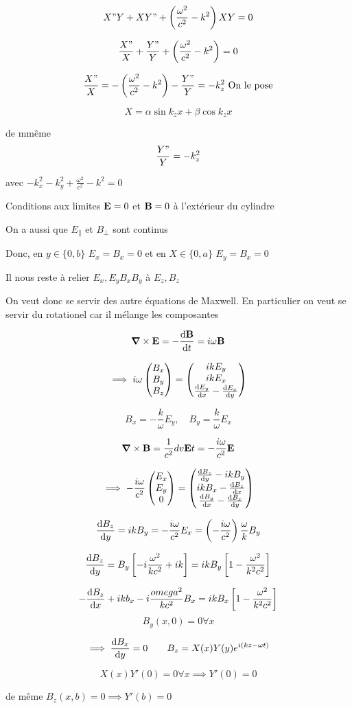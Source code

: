 $$X"Y + X Y" + \left( \frac{\omega^2}{c^2} -k^2 \right)XY =0 $$ 

$$\frac{X"}{X} + \frac{Y"}{Y}  + \left( \frac{\omega^2}{c^2} -k^2 \right) = 0 $$ 

$$\frac{X"}{X} = - \left( \frac{\omega^2}{c^2} -k^2  \right)- \frac{Y"}{Y} = -k_{z}^2 \text{ On le pose} $$ 

$$X = \alpha \sin k_{z} x+\beta \cos k_{z} x$$ 

de mmême $$\frac{Y"}{Y} = -k_{z}^2$$ 

avec $-k_{x}^2 -k_{y}^2 + \frac{\omega^2}{c^2} -k^2 = 0$ 

Conditions aux limites $\vb{E} = 0$ et $\vb{B}=0$ à l'extérieur du cylindre  


On a aussi que $E_{\parallel}$ et $B_{\perp} $ sont continus 

Donc, en $y\in\{0,b\}$ $E_{x} =B_{x} =0$  et en $X\in\{0,a\}$ $E_{y} = B_{x} = 0$ 


Il nous reste à relier $E_{x}, E_{y} B_{x} B_{y}$ à $E_{z},B_{z} $  

On veut donc se servir des autre équations de Maxwell. En particulier on veut se servir du rotationel car il mélange les composantes


$$\grad \times  \vb{ E} = - \dv{\vb{B}}{t} = i\omega \vb{B} $$ 

$$\implies i\omega \begin{pmatrix} B_{x}\\ B_{y} \\B_{z}  \end{pmatrix} = \begin{pmatrix} ikE_{y} \\ikE_{x} \\ \dv{E_y}{x} - \dv{E_x}{y} \end{pmatrix}$$ 

$$B_{x} = -\frac{k}{\omega} E_{y}, \quad B_{y} = \frac{k}{\omega} E_x$$ 


$$\grad \times \vb{B} = \frac{1}{c^2} dv{\vb{E}}{t} = -\frac{i\omega}{c^2} \vb{E}$$ 


$$\implies -\frac{i\omega}{c^2} \begin{pmatrix} E_{x} \\ E_{y} \\0  \end{pmatrix} = \begin{pmatrix} \dv{B_z}{y} - ikB_{y}\\ ikB_{x} - \dv{B_z}{x}\\ \dv{B_y}{x} - \dv{B_x}{y} \end{pmatrix}$$ 


$$\dv{B_{z} }{y} = ikB_{y} = -\frac{i\omega}{c^2} E_{x} = \left( -\frac{i\omega}{c^2}  \right) \frac{\omega}{k} B_y$$ 

$$\dv{B_z}{y} = B_{y} \left[ -i \frac{\omega^2}{kc^2} + ik \right] = ikB_{y} \left[ 1- \frac{\omega^2}{k^2c^2}  \right] $$ 


$$- \dv{B_z}{x} +i k b_{x} -i \frac{omega^2}{kc^2} B_{x} = ikB_{x} \left[ 1 - \frac{\omega^2}{k^2c^2} \right] $$ 
$$B_y(x,0) = 0 \forall x$$ 


$$\implies \dv{B_x}{y}(x,0) = 0\qquad B_{z} = X(x)Y(y) e^{i(kz-\omega t)}$$ 


$$X(x)Y'(0) =0 \forall x\implies Y'(0) =0$$  


de même $B_z(x,b) = 0 \implies Y'(b)=0$ 









